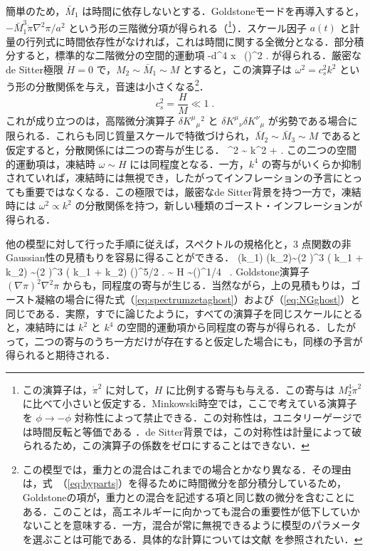簡単のため，$\bar M_1$ は時間に依存しないとする．Goldstoneモードを再導入すると，$-\bar M_1^3 \dot\pi\nabla^2\pi/a^2$ という形の三階微分項が得られる（\footnote{この演算子は，$\dot\pi^2$ に対して，$H$ に比例する寄与も与える．この寄与は $M_2^4 \dot\pi^2$ に比べて小さいと仮定する．Minkowski時空では，ここで考えている演算子を $\phi \to -\phi$ 対称性によって禁止できる．この対称性は，ユニタリーゲージでは時間反転と等価である \cite{Arkani-Hamed:2003pdi}．de Sitter背景では，この対称性は計量によって破られるため，この演算子の係数をゼロにすることはできない．}）．スケール因子 $a(t)$ と計量の行列式に時間依存性がなければ，これは時間に関する全微分となる．部分積分すると，標準的な二階微分の空間的運動項
\be
\label{eq:byparts}
-\int d^4 x  \,
\left(\pi\right)^2 \;.
\ee
が得られる．厳密なde Sitter極限 $\dot H =0$ で，$M_2 \sim \bar
M_1 \sim M$ とすると，この演算子は $\omega^2 = c_s^2 k^2$ という形の分散関係を与え，音速は小さくなる\footnote{この模型では，重力との混合はこれまでの場合とかなり異なる．その理由は，式~（\ref{eq:byparts}）を得るために時間微分を部分積分しているため，Goldstoneの項が，重力との混合を記述する項と同じ数の微分を含むことにある．このことは，高エネルギーに向かっても混合の重要性が低下していかないことを意味する．一方，混合が常に無視できるように模型のパラメータを選ぶことは可能である．具体的な計算については文献 \cite{Creminelli:2006rz} を参照されたい．}．
\begin{equation}
c^2_s=\frac{H}{M}\ll 1 \;.
\end{equation}
これが成り立つのは，高階微分演算子 $\delta K^\mu {}_\mu {}^2$ と
$\delta K^\mu {}_\nu \delta K^\nu {}_\mu$ が劣勢である場合に限られる．これらも同じ質量スケールで特徴づけられ，$\bar M_2 \sim \bar
M_3 \sim M$ であると仮定すると，分散関係には二つの寄与が生じる．
\be
\omega^2 \sim {} k^2 +  \;.
\ee
この二つの空間的運動項は，凍結時 $\omega \sim
H$ には同程度となる．一方，$k^4$ の寄与がいくらか抑制されていれば，凍結時には無視でき，したがってインフレーションの予言にとっても重要ではなくなる．この極限では，厳密なde Sitter背景を持つ一方で，凍結時には $\omega^2 \propto k^2$ の分散関係を持つ，新しい種類のゴースト・インフレーションが得られる．

他の模型に対して行った手順に従えば，スペクトルの規格化と，3 点関数の非Gaussian性の見積もりを容易に得ることができる．
\be
\label{eq:spectrumzetaleo}
\langle \zeta(\vec k_1) \zeta(\vec k_2)\rangle \sim (2 \pi)^3 \delta(\vec
k_1 + \vec k_2)      \sim (2 \pi)^3 \delta(\vec
k_1 + \vec k_2)  \left(\right)^{5/2}  \;.
\ee
\be
{}\sim
{} H \pi \sim\left(\right)^{1/4} \, .
\ee
Goldstone演算子 $(\nabla\pi)^2\nabla^2\pi$ からも，同程度の寄与が生じる．当然ながら，上の見積もりは，ゴースト凝縮の場合に得た式（\ref{eq:spectrumzetaghost}）および（\ref{eq:NGghost}）と同じである．実際，すでに論じたように，すべての演算子を同じスケールにとると，凍結時には $k^2$ と $k^4$ の空間的運動項から同程度の寄与が得られる．したがって，二つの寄与のうち一方だけが存在すると仮定した場合にも，同様の予言が得られると期待される．

